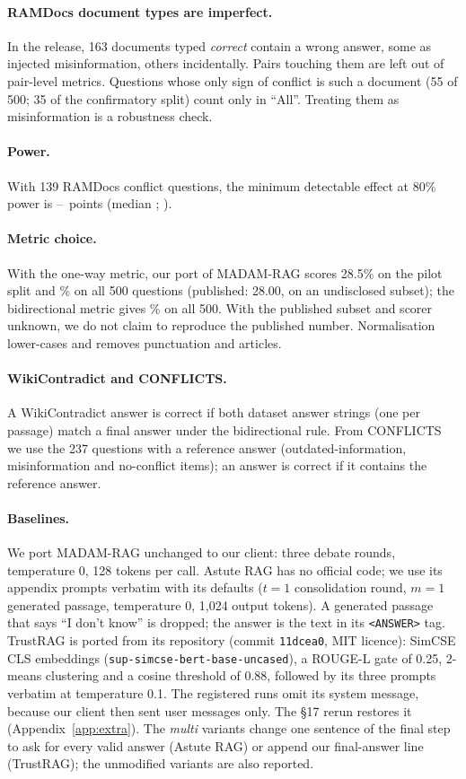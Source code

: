 \paragraph{RAMDocs document types are imperfect.} In the release, 163 documents typed \emph{correct} contain a
wrong answer, some as injected misinformation, others incidentally. Pairs touching them are left out of pair-level
metrics. Questions whose only sign of conflict is such a document (55 of 500; 35 of the confirmatory split) count
only in ``All''. Treating them as misinformation is a robustness check.

\paragraph{Power.} With 139 RAMDocs conflict questions, the minimum detectable effect at 80\% power is
\mdeLo--\mdeHi\ points (median \mdeMed; \citealp{card2020power}).

\paragraph{Metric choice.} With the one-way metric, our port of MADAM-RAG scores 28.5\% on the pilot split and
\madamOneWay\% on all 500 questions (published: 28.00, on an undisclosed subset); the bidirectional metric gives
\madamBidir\% on all 500. With the published subset and scorer unknown, we do not claim to reproduce the
published number. Normalisation lower-cases and removes punctuation and articles.

\paragraph{WikiContradict and CONFLICTS.} A WikiContradict answer is correct if both dataset answer strings
(one per passage) match a final answer under the bidirectional rule. From CONFLICTS we use the 237 questions with
a reference answer (outdated-information, misinformation and no-conflict items); an answer is correct if it
contains the reference answer.

\paragraph{Baselines.} We port MADAM-RAG unchanged to our client: three debate rounds, temperature 0, 128 tokens
per call. Astute RAG has no official code; we use its appendix prompts verbatim with its defaults
($t{=}1$ consolidation round, $m{=}1$ generated passage, temperature 0, 1,024 output tokens). A generated
passage that says ``I don't know'' is dropped; the answer is the text in its \texttt{<ANSWER>} tag. TrustRAG is
ported from its repository (commit \texttt{11dcea0}, MIT licence): SimCSE CLS embeddings
(\texttt{sup-simcse-bert-base-uncased}), a ROUGE-L gate of 0.25, 2-means clustering and a cosine threshold of 0.88,
followed by its three prompts verbatim at temperature 0.1. The registered runs omit its system message, because our client then sent
user messages only. The \S17 rerun restores it (Appendix~\ref{app:extra}). The \emph{multi} variants change one sentence of the final step to ask for every valid answer
(Astute RAG) or append our final-answer line (TrustRAG); the unmodified variants are also reported.

